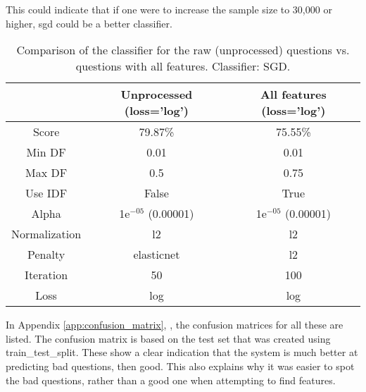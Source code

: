 This could indicate that if one were to increase the sample size to 30,000 or higher, \gls{sgd} could be a better classifier.
\begin{table}[!h]%
	\centering
	\begin{tabular}{| c | c | c |}
		\hline
		~				& Unprocessed (loss='log')	& All features (loss='log')	\\ \hline
		Score 			& 79.87\%					& 75.55\%					\\ \hline
		Min DF 			& 0.01						& 0.01						\\ \hline
		Max DF 			& 0.5						& 0.75						\\ \hline
		Use IDF			& False						& True						\\ \hline
		Alpha 			& 1e$^{-05}$ (0.00001)		& 1e$^{-05}$ (0.00001)		\\ \hline
		Normalization 	& l2						& l2						\\ \hline		
		Penalty 		& elasticnet				& l2						\\ \hline
		Iteration 		& 50						& 100						\\ \hline
		Loss 			& log						& log						\\ \hline		
	\end{tabular}
	\caption{Comparison of the classifier for the raw (unprocessed) questions vs. questions with all features. Classifier: SGD.}
	\label{tab:unprocessed_vs_all_feature_detectors_sgd_so}
\end{table}
\vspace{0.5em}\newline
In Appendix \ref{app:confusion_matrix}, \pageref{app:confusion_matrix}, the confusion matrices for all these are listed. 
The confusion matrix is based on the test set that was created using train\_test\_split.
These show a clear indication that the system is much better at predicting bad questions, then good.
This also explains why it was easier to spot the bad questions, rather than a good one when attempting to find features. 


